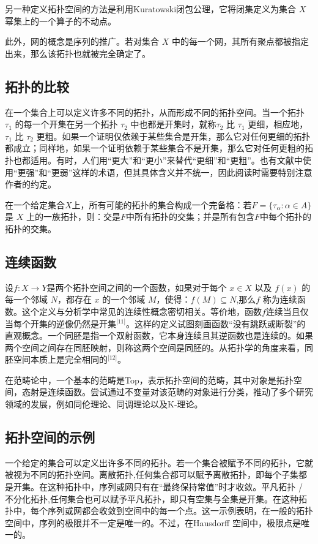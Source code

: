 另一种定义拓扑空间的方法是利用Kuratowski闭包公理，它将闭集定义为集合 $X$ 幂集上的一个算子的不动点。

此外，网的概念是序列的推广。若对集合 $X$ 中的每一个网，其所有聚点都被指定出来，那么该拓扑也就被完全确定了。
\subsection{拓扑的比较}
在一个集合上可以定义许多不同的拓扑，从而形成不同的拓扑空间。当一个拓扑 $\tau_1$ 的每一个开集在另一个拓扑 $\tau_2$ 中也都是开集时，就称$\tau_2$ 比 $\tau_1$ 更细，相应地，$\tau_1$ 比 $\tau_2$ 更粗。如果一个证明仅依赖于某些集合是开集，那么它对任何更细的拓扑都成立；同样地，如果一个证明依赖于某些集合不是开集，那么它对任何更粗的拓扑也都适用。有时，人们用“更大”和“更小”来替代“更细”和“更粗”。也有文献中使用“更强”和“更弱”这样的术语，但其具体含义并不统一，因此阅读时需要特别注意作者的约定。

在一个给定集合$X$上，所有可能的拓扑的集合构成一个完备格：若$F = \{\tau_\alpha : \alpha \in A\}$是 $X$ 上的一族拓扑，则：交是$F$中所有拓扑的交集；并是所有包含$F$中每个拓扑的拓扑的交集。
\subsection{连续函数}
设$f: X \to Y$是两个拓扑空间之间的一个函数，如果对于每个 $x \in X$ 以及 $f(x)$ 的每一个邻域 $N$，都存在 $x$ 的一个邻域 $M$，使得：$f(M) \subseteq N$,那么$f$ 称为连续函数。这个定义与分析学中常见的连续性概念密切相关。等价地，函数$f$连续当且仅当每个开集的逆像仍然是开集\(^\text{[11]}\)。这样的定义试图刻画函数“没有跳跃或断裂”的直观概念。一个同胚是指一个双射函数，它本身连续且其逆函数也是连续的。如果两个空间之间存在同胚映射，则称这两个空间是同胚的。从拓扑学的角度来看，同胚空间本质上是完全相同的\(^\text{[12]}\)。

在范畴论中，一个基本的范畴是Top，表示拓扑空间的范畴，其中对象是拓扑空间，态射是连续函数。尝试通过不变量对该范畴的对象进行分类，推动了多个研究领域的发展，例如同伦理论、同调理论以及K-理论。
\subsection{拓扑空间的示例}
一个给定的集合可以定义出许多不同的拓扑。若一个集合被赋予不同的拓扑，它就被视为不同的拓扑空间。离散拓扑,任何集合都可以赋予离散拓扑，即每个子集都是开集。在这种拓扑中，序列或网只有在“最终保持常值”时才收敛。平凡拓扑 / 不分化拓扑,任何集合也可以赋予平凡拓扑，即只有空集与全集是开集。在这种拓扑中，每个序列或网都会收敛到空间中的每一个点。这一示例表明，在一般的拓扑空间中，序列的极限并不一定是唯一的。不过，在Hausdorff 空间中，极限点是唯一的。


